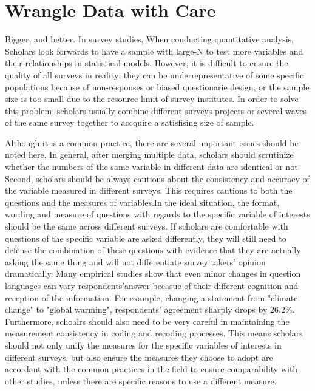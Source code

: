 

\section{Wrangle Data with Care}
Bigger, and better. In survey studies, When conducting quantitative analysis, Scholars look forwards to have a sample with large-N to test more variables and their relationships in statistical models. However, it is difficult to ensure the quality of all surveys in reality: they can be underrepresentative of some specific populations because of  non-responses or biased questionarie design, or the sample size is too small due to the resource limit of survey institutes. In order to solve this problem, scholars usually combine different surveys projects or several waves of the same survey together to accquire a satisfising size of sample. 

Although it is a common practice, there are several important issues should be noted here. In general, after merging multiple data, scholars should scrutinize whether the numbers of the same variable in different data are identical or not. Second, scholars should be always cautious about the consistency and accuracy of the variable measured in different surveys. This requires cautions to both the questions and the measures of variables.In the ideal situation, the format, wording and measure of questions with regards to the specific variable of interests should be the same across different surveys. If scholars are comfortable with questions of the specific variable are asked differently, they will still need to defense the combination of these questions with evidence that they are actually asking the same thing and will not differentiate survey takers' opinion dramatically. Many empirical studies show that even minor changes in question languages can vary respondents'answer becasue of their different cognition and reception of the information. \citep{Bishop1978}\citep{Rasinski1989}\citep{Zaller1992}\citep{Bertrand2001} For example, changing a statement from "climate change" to "global warming", respondents' agreement sharply drops by 26.2\%. \citep{Schuldt2011} Furthermore, schoalrs should also need to be very careful in maintaining the measurement consistency in coding and recoding processes. This means scholars should not only unify the measures for the specific variables of interests in different surveys, but also ensure the measures they choose to adopt are accordant with the common practices in the field to ensure comparability with other studies, unless there are specific reasons to use a different measure. 


